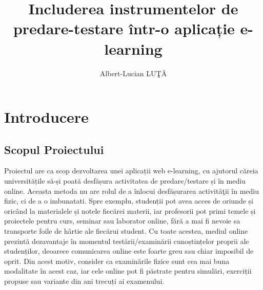 \documentclass[12pt, a4paper, oneside, romanian]{teza-upb}
\begin{document}
\author{Albert-Lucian LUŢĂ}

\title{Includerea instrumentelor de predare-testare într-o aplicație e-learning}



\beforepreface
\newpage
\listoffigures
{}
\afterpreface 

\chapter*{Introducere}

\section{Scopul Proiectului}

Proiectul are ca scop dezvoltarea unei aplicații web e-learning, cu ajutorul căreia universitățile să-și poată desfășura activitatea de predare/testare și în mediu online. Aceasta metoda nu are rolul de a înlocui desfășurarea activităţii în mediu fizic, ci de a o imbunatati. Spre exemplu, studenții pot avea acces de oriunde și oricând la materialele și notele fiecărei materii, iar profesorii pot primi temele și proiectele pentru curs, seminar sau laborator online, fără a  mai fi nevoie sa transporte foile de hârtie ale fiecărui student. Cu toate acestea, mediul online prezintă dezavantaje în momentul testării/examinării cunoștințelor proprii ale studenților, deoarece comunicarea online este foarte greu sau chiar imposibil de oprit. Din acest motiv, consider ca examinările fizice sunt cea mai buna modalitate în acest caz, iar cele online pot fi păstrate pentru simulări, exerciții propuse sau variante din ani trecuți ai examenului.
\end{document}
